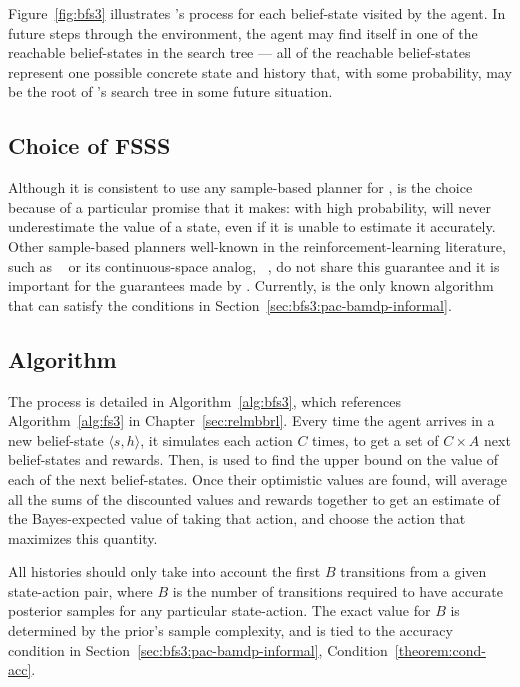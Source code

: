 Figure~\ref{fig:bfs3} illustrates 's process for each belief-state visited by the agent. In future steps through the environment, the agent may find itself in one of the reachable belief-states in the search tree --- all of the reachable belief-states represent one possible concrete state and history that, with some probability, may be the root of 's search tree in some future situation. 

\subsection{Choice of FSSS}

Although it is consistent to use any sample-based planner for ,  is the choice because of a particular promise that it makes: with high probability,  will never underestimate the value of a state, even if it is unable to estimate it accurately. Other sample-based planners well-known in the reinforcement-learning literature, such as ~\cite{kocsis06} or its continuous-space analog, ~\cite{mansley2011sample}, do not share this guarantee and it is important for the guarantees made by . Currently,  is the only known algorithm that can satisfy the conditions in Section~\ref{sec:bfs3:pac-bamdp-informal}.

\subsection{Algorithm}

The  process is detailed in Algorithm~\ref{alg:bfs3}, which references Algorithm~\ref{alg:fs3} in Chapter~\ref{sec:relmbbrl}. Every time the agent arrives in a new belief-state $\langle s, h\rangle$, it simulates each action $C$ times, to get a set of $C \times A$ next belief-states and rewards. Then,  is used to find the upper bound on the value of each of the next belief-states. Once their optimistic values are found,  will average all the sums of the discounted values and rewards together to get an estimate of the Bayes-expected value of taking that action, and choose the action that maximizes this quantity.

All histories should only take into account the first $B$ transitions from a given state-action pair, where $B$ is the number of transitions required to have accurate posterior samples for any particular state-action. The exact value for $B$ is determined by the prior's sample complexity, and is tied to the accuracy condition in Section~\ref{sec:bfs3:pac-bamdp-informal}, Condition~\ref{theorem:cond-acc}.

